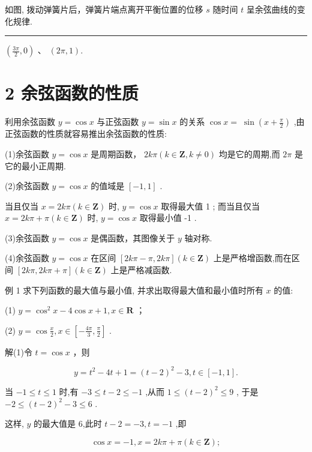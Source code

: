 \documentclass[10pt]{article}
\newcommand{\HRule}{\begin{center}\rule{0.9\linewidth}{0.2mm}\end{center}}
\begin{document}
如图, 拨动弹簧片后，弹簧片端点离开平衡位置的位移 \(s\) 随时间 \(t\) 呈余弦曲线的变化规律.

\HRule

\(\left( {\frac{3\pi }{2},0}\right) \text{ 、 }\left( {{2\pi },1}\right) .\)

\section*{2 余弦函数的性质}

利用余弦函数 \(y = \cos x\) 与正弦函数 \(y = \sin x\) 的关系 \(\cos x = \; \sin \left( {x + \frac{\pi }{2}}\right)\) ,由正弦函数的性质就容易推出余弦函数的性质:

(1)余弦函数 \(y = \cos x\) 是周期函数， \({2k\pi }\left( {k \in  \mathbf{Z},k \neq  0}\right)\) 均是它的周期,而 \({2\pi }\) 是它的最小正周期.

(2)余弦函数 \(y = \cos x\) 的值域是 \(\left\lbrack  {-1,1}\right\rbrack\) .

当且仅当 \(x = {2k\pi }\left( {k \in  \mathbf{Z}}\right)\) 时, \(y = \cos x\) 取得最大值 1 ; 而当且仅当 \(x = {2k\pi } + \pi \left( {k \in  \mathbf{Z}}\right)\) 时, \(y = \cos x\) 取得最小值 -1 .

(3)余弦函数 \(y = \cos x\) 是偶函数，其图像关于 \(y\) 轴对称.

(4)余弦函数 \(y = \cos x\) 在区间 \(\left\lbrack  {{2k\pi } - \pi ,{2k\pi }}\right\rbrack  \left( {k \in  \mathbf{Z}}\right)\) 上是严格增函数,而在区间 \(\left\lbrack  {{2k\pi },{2k\pi } + \pi }\right\rbrack  \left( {k \in  \mathbf{Z}}\right)\) 上是严格减函数.

例 1 求下列函数的最大值与最小值, 并求出取得最大值和最小值时所有 \(x\) 的值:

(1) \(y = {\cos }^{2}x - 4\cos x + 1,x \in  \mathbf{R}\) ；

(2) \(y = \cos \frac{x}{2},x \in  \left\lbrack  {-\frac{4\pi }{3},\frac{\pi }{2}}\right\rbrack\) .

解(1)令 \(t = \cos x\) ，则

\[
y = {t}^{2} - {4t} + 1 = {\left( t - 2\right) }^{2} - 3,t \in  \left\lbrack  {-1,1}\right\rbrack  .
\]

当 \(- 1 \leq  t \leq  1\) 时,有 \(- 3 \leq  t - 2 \leq   - 1\) ,从而 \(1 \leq  {\left( t - 2\right) }^{2} \leq  9\) , 于是 \(- 2 \leq  {\left( t - 2\right) }^{2} - 3 \leq  6\) .

这样, \(y\) 的最大值是 6,此时 \(t - 2 =  - 3,t =  - 1\) ,即

\[
\cos x =  - 1,x = {2k\pi } + \pi \left( {k \in  \mathbf{Z}}\right) ;
\]
\end{document}
